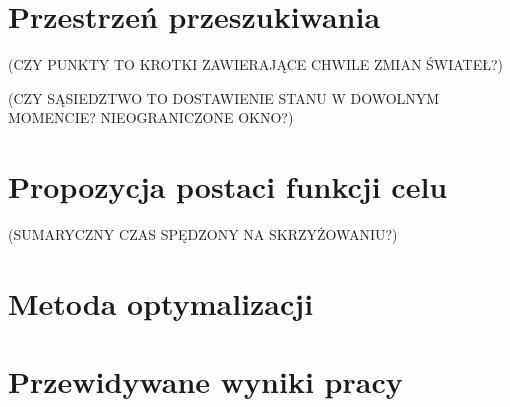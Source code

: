 \documentclass[a4paper]{article}
\begin{document}
\section{Przestrzeń przeszukiwania}


(CZY PUNKTY TO KROTKI ZAWIERAJĄCE CHWILE ZMIAN ŚWIATEŁ?)

(CZY SĄSIEDZTWO TO DOSTAWIENIE STANU W DOWOLNYM MOMENCIE? NIEOGRANICZONE OKNO?)

\section{Propozycja postaci funkcji celu}
(SUMARYCZNY CZAS SPĘDZONY NA SKRZYŻOWANIU?)

\section{Metoda optymalizacji}

\section{Przewidywane wyniki pracy}
\end{document}

